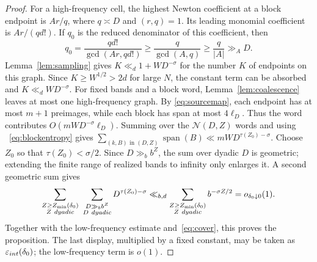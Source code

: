\documentclass[10pt,a4paper]{amsart}
\newcommand{\Span}{\operatorname{span}}
\begin{document}
\begin{proof}
For a high-frequency cell, the highest Newton coefficient at a block endpoint
is $Ar/q$, where $q\asymp D$ and $(r,q)=1$. Its leading monomial coefficient
is $Ar/(qd!)$. If $q_0$ is the reduced denominator of this coefficient, then
\[
 q_0=\frac{qd!}{\gcd(Ar,qd!)}
 \ge\frac q{\gcd(A,q)}
 \ge\frac q{|A|}
 \gg_A D.
\]
Lemma~\ref{lem:sampling} gives $K\ll_d1+WD^{-\sigma}$ for the number $K$ of
endpoints on this graph. Since $K\ge W^{1/2}>2d$ for large $N$, the constant
term can be absorbed and $K\ll_dWD^{-\sigma}$. For fixed bands and a block
word, Lemma~\ref{lem:coalescence} leaves at most one high-frequency graph. By
\eqref{eq:sourcemap}, each endpoint has at most $m+1$ preimages, while each
block has span at most $4\ell_D$. Thus the word contributes
$O(mWD^{-\sigma}\ell_D)$. Summing over the $\mathcal N(D,Z)$ words and using
~\eqref{eq:blockentropy} gives
$\sum_{(k,B)\text{ in }(D,Z)}\Span(B)
\ll mW D^{\tau(Z_0)-\sigma}$.
Choose $Z_0$ so that $\tau(Z_0)<\sigma/2$. Since $D\gg_b b^Z$, the sum over
dyadic $D$ is geometric; extending the finite range of realized bands to
infinity only enlarges it. A second geometric sum gives
\[
 \sum_{\substack{Z\ge Z_{\min}(\delta_0)\\ Z\ {\rm dyadic}}}
 \ \sum_{\substack{D\gg_b b^Z\\ D\ {\rm dyadic}}}
 D^{\tau(Z_0)-\sigma}
 \ll_{b,d}
 \sum_{\substack{Z\ge Z_{\min}(\delta_0)\\ Z\ {\rm dyadic}}}
 b^{-\sigma Z/2}=o_{\delta_0\downarrow0}(1).
\]
Together with the low-frequency estimate and~\eqref{eq:cover}, this proves the
proposition. The last display, multiplied by a fixed constant, may be taken
as $\varepsilon_{\rm int}(\delta_0)$; the low-frequency term is $o(1)$.
\end{proof}
\end{document}
